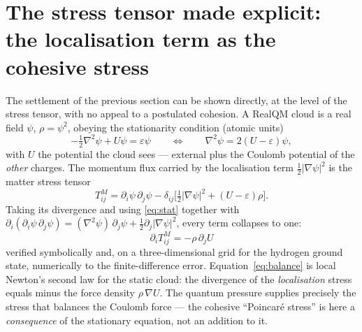 \documentclass[11pt]{article}
\begin{document}
\section{The stress tensor made explicit: the localisation term as the cohesive stress}
The settlement of the previous section can be shown directly, at the level of the stress tensor, with no appeal to
a postulated cohesion. A RealQM cloud is a real field $\psi$, $\rho=\psi^2$, obeying the stationarity condition
(atomic units)
\begin{equation}
-\tfrac12\nabla^2\psi + U\psi = \varepsilon\psi
\qquad\Longleftrightarrow\qquad
\nabla^2\psi = 2(U-\varepsilon)\psi,
\label{eq:stat}
\end{equation}
with $U$ the potential the cloud sees --- external plus the Coulomb potential of the \emph{other} charges. The
momentum flux carried by the localisation term $\tfrac12|\nabla\psi|^2$ is the matter stress tensor
\begin{equation}
T^{M}_{ij} = \partial_i\psi\,\partial_j\psi - \delta_{ij}\Big[\tfrac12|\nabla\psi|^2 + (U-\varepsilon)\rho\Big].
\label{eq:TM}
\end{equation}
Taking its divergence and using \eqref{eq:stat} together with
$\partial_i(\partial_i\psi\,\partial_j\psi)=(\nabla^2\psi)\,\partial_j\psi+\tfrac12\partial_j|\nabla\psi|^2$, every
term collapses to one:
\begin{equation}
\boxed{\;\partial_i T^{M}_{ij} = -\rho\,\partial_j U\;}
\label{eq:balance}
\end{equation}
verified symbolically and, on a three-dimensional grid for the hydrogen ground state, numerically to the
finite-difference error. Equation~\eqref{eq:balance} is local Newton's second law for the static cloud: the
divergence of the \emph{localisation} stress equals minus the force density $\rho\,\nabla U$. The quantum pressure
supplies precisely the stress that balances the Coulomb force --- the cohesive ``Poincar\'e stress'' is here a
\emph{consequence} of the stationary equation, not an addition to it.
\end{document}
